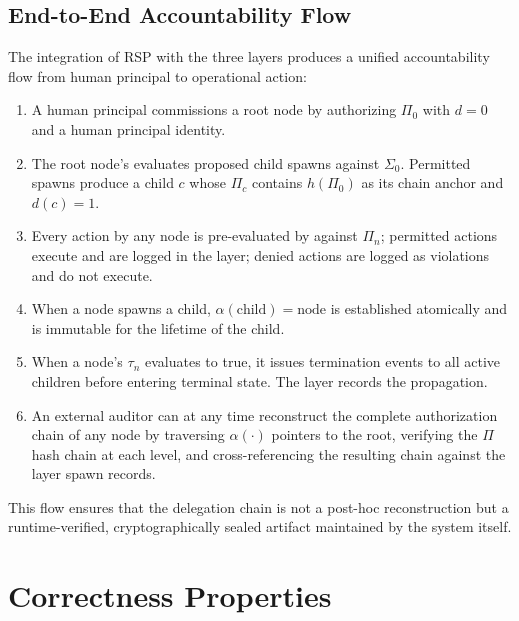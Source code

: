 \subsection{End-to-End Accountability Flow}

The integration of RSP with the three \bxthree layers produces a unified accountability flow from human principal to operational action:

\begin{enumerate}
    \setlength\itemsep{0.35em}
    \item A human principal commissions a root node by authorizing $\Pi_0$ with $d = 0$ and a human principal identity.
    \item The root node's \bounds evaluates proposed child spawns against $\Sigma_0$. Permitted spawns produce a child $c$ whose $\Pi_c$ contains $h(\Pi_0)$ as its chain anchor and $d(c) = 1$.
    \item Every action by any node is pre-evaluated by \bounds against $\Pi_n$; permitted actions execute and are logged in the \fact layer; denied actions are logged as violations and do not execute.
    \item When a node spawns a child, $\alpha(\text{child}) = \text{node}$ is established atomically and is immutable for the lifetime of the child.
    \item When a node's $\tau_n$ evaluates to true, it issues termination events to all active children before entering terminal state. The \fact layer records the propagation.
    \item An external auditor can at any time reconstruct the complete authorization chain of any node by traversing $\alpha(\cdot)$ pointers to the root, verifying the $\Pi$ hash chain at each level, and cross-referencing the resulting chain against the \fact layer spawn records.
\end{enumerate}

This flow ensures that the delegation chain is not a post-hoc reconstruction but a runtime-verified, cryptographically sealed artifact maintained by the system itself.


\section{Correctness Properties}
\label{sec:correctness}

